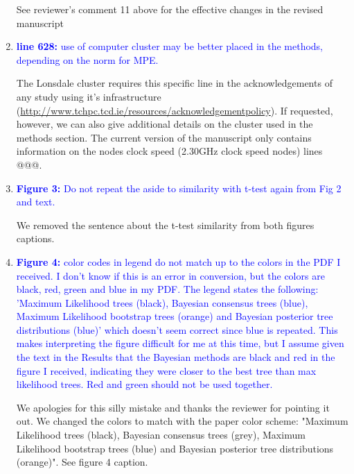 \documentclass[12pt,letterpaper]{article}
\begin{document}
\begin{enumerate}
See reviewer's comment 11 above for the effective changes in the revised manuscript

\item{\textcolor{blue}{\textbf{line 628:} use of computer cluster may be better placed in the methods, depending on the norm for MPE.}}

The Lonsdale cluster requires this specific line in the acknowledgements of any study using it's infrastructure (\url{http://www.tchpc.tcd.ie/resources/acknowledgementpolicy}).
If requested, however, we can also give additional details on the cluster used in the methods section.
The current version of the manuscript only contains information on the nodes clock speed (2.30GHz clock speed nodes) lines @@@.

\item{\textcolor{blue}{\textbf{Figure 3:} Do not repeat the aside to similarity with t-test again from Fig 2 and text.}}

We removed the sentence about the t-test similarity from both figures captions. %

\item{\textcolor{blue}{\textbf{Figure 4:} color codes in legend do not match up to the colors in the PDF I received. I don't know if this is an error in conversion, but the colors are black, red, green and blue in my PDF. The legend states the following: 'Maximum Likelihood trees (black), Bayesian consensus trees (blue), Maximum Likelihood bootstrap trees (orange) and Bayesian posterior tree distributions (blue)' which doesn't seem correct since blue is repeated. This makes interpreting the figure difficult for me at this time, but I assume given the text in the Results that the Bayesian methods are black and red in the figure I received, indicating they were closer to the best tree than max likelihood trees. Red and green should not be used together.}}

We apologies for this silly mistake and thanks the reviewer for pointing it out. We changed the colors to match with the paper color scheme: "Maximum Likelihood trees (black), Bayesian consensus trees (grey), Maximum Likelihood bootstrap trees (blue) and Bayesian posterior tree distributions (orange)". See figure 4 caption.


\end{enumerate}
\end{document}
